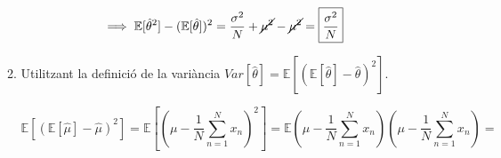 \documentclass[a4paper]{article}
\begin{document}
\begin{enumerate}
\begin{enumerate}
    $$ \implies  \mathbb{E}[\hat{\theta}^2] - (\mathbb{E}[\hat{\theta}])^2  = \frac{\sigma^2}{N}+\cancel{\mu^2} - \cancel{\mu^2} = \boxed{\frac{\sigma^2}{N}} $$
    
    \item Utilitzant la definició de la variància $Var[\hat{\theta}] = \mathbb{E}[(\mathbb{E}[\hat{\theta}] - \hat{\theta})^2]$.
    
    $$ \mathbb{E}[(\mathbb{E}[\hat{\mu}]-\hat{\mu})^2] = \mathbb{E}[(\mu-\frac{1}{N}\sum_{n=1}^{N}x_n)^2] = \mathbb{E}(\mu-\frac{1}{N}\sum_{n=1}^{N}x_n)(\mu-\frac{1}{N}\sum_{n=1}^{N}x_n) = $$
    
    
\end{enumerate}

\end{enumerate}
\end{document}
